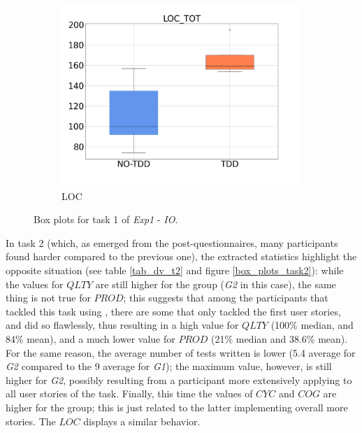 \begin{figure}[H]
\begin{subfigure}{0.33\textwidth}
        \includegraphics[width=\linewidth]{figures/box_plots/task1/LOC.png}
        \caption{LOC}
        \label{bp_task1_loc}
    \end{subfigure}
    \caption{Box plots for task 1 of \textit{Exp1} - \textit{IO}.}
    \label{box_plots_task1}
\end{figure}

In task 2 (which, as emerged from the post-questionnaires, many participants found harder compared to the previous one), the extracted statistics highlight the opposite situation (see table \ref{tab_dv_t2} and figure \ref{box_plots_task2}): while the values for $QLTY$ are still higher for the \tdd group (\textit{G2} in this case), the same thing is not true for $PROD$; this suggests that among the participants that tackled this task using \tdd, there are some that only tackled the first user stories, and did so flawlessly, thus resulting in a high value for $QLTY$ (100\% median, and 84\% mean), and a much lower value for $PROD$ (21\% median and 38.6\% mean). 
For the same reason, the average number of tests written is lower (5.4 average for \textit{G2} compared to the 9 average for \textit{G1}); the maximum value, however, is still higher for \textit{G2}, possibly resulting from a participant more extensively applying \tdd to all user stories of the task.
Finally, this time the values of $CYC$ and $COG$ are higher for the \notdd group; this is just related to the latter implementing overall more stories. The $LOC$ displays a similar behavior.


